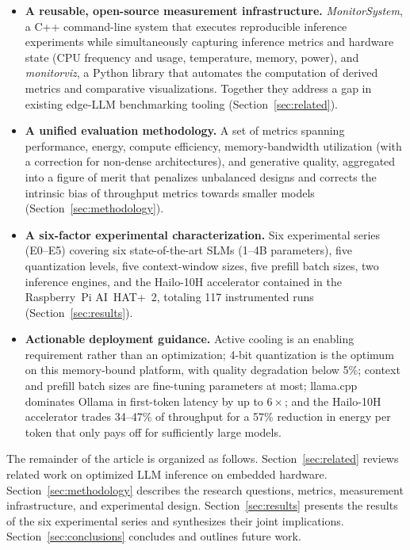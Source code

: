 \documentclass[acmsmall,natbib=false]{acmart}
\begin{document}
\begin{itemize}
  \item \textbf{A reusable, open-source measurement infrastructure.}
    \textit{MonitorSystem}, a C++ command-line system that executes
    reproducible inference experiments while simultaneously capturing
    inference metrics and hardware state (CPU frequency and usage,
    temperature, memory, power), and \textit{monitorviz}, a Python library
    that automates the computation of derived metrics and comparative
    visualizations. Together they address a gap in existing edge-LLM
    benchmarking tooling (Section~\ref{sec:related}).
  \item \textbf{A unified evaluation methodology.} A set of metrics spanning
    performance, energy, compute efficiency, memory-bandwidth utilization
    (with a correction for non-dense architectures), and generative quality,
    aggregated into a figure of merit that penalizes unbalanced designs and
    corrects the intrinsic bias of throughput metrics towards smaller models
    (Section~\ref{sec:methodology}).
  \item \textbf{A six-factor experimental characterization.} Six experimental
    series (E0--E5) covering six state-of-the-art SLMs (1--4B parameters),
    five quantization levels, five context-window sizes, five prefill batch
    sizes, two inference engines, and the Hailo-10H accelerator contained in
    the Raspberry~Pi AI~HAT+~2, totaling 117 instrumented runs
    (Section~\ref{sec:results}).
  \item \textbf{Actionable deployment guidance.} Active cooling is an
    enabling requirement rather than an optimization; 4-bit quantization is
    the optimum on this memory-bound platform, with quality degradation below
    5\%; context and prefill batch sizes are fine-tuning parameters at most;
    llama.cpp dominates Ollama in first-token latency by up to $6\times$; and
    the Hailo-10H accelerator trades 34--47\% of throughput for a 57\%
    reduction in energy per token that only pays off for sufficiently large
    models.
\end{itemize}

The remainder of the article is organized as follows.
Section~\ref{sec:related} reviews related work on optimized LLM inference on
embedded hardware. Section~\ref{sec:methodology} describes the research
questions, metrics, measurement infrastructure, and experimental design.
Section~\ref{sec:results} presents the results of the six experimental
series and synthesizes their joint implications.
Section~\ref{sec:conclusions} concludes and outlines future work.
\end{document}
